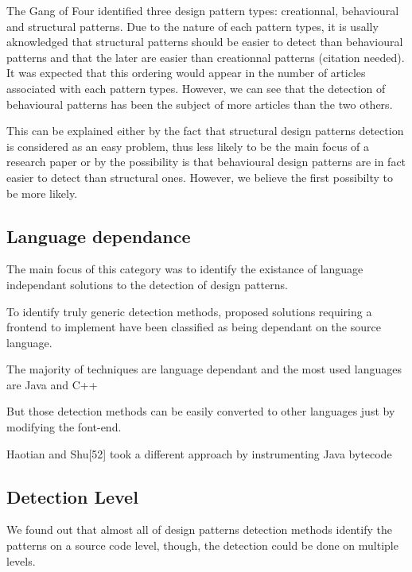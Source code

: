 \documentclass[letterpaper, 10 pt, conference]{ieeeconf}  %
\begin{document}
The Gang of Four identified three design pattern types: creationnal,
behavioural and structural patterns.
Due to the nature of each pattern types, it is usally aknowledged that
structural patterns should be easier to detect than behavioural patterns and
that the later are easier than creationnal patterns (citation needed). 
It was expected that this ordering would appear in the number of articles
associated with each pattern types. 
However, we can see that the detection of behavioural patterns has been the
subject of more articles than the two others.


This can be explained either by the fact that structural design patterns
detection is considered as an easy problem, thus less likely to be the main
focus of a research paper or by the possibility is that behavioural design
patterns are in fact easier to detect than structural ones.
However, we believe the first possibilty to be more likely.



\subsection{Language dependance}
The main focus of this category was to identify the existance of language
independant solutions to the detection of design patterns.

To identify truly generic detection methods, proposed solutions requiring a
frontend to implement have been classified as being dependant on the source
language. 

The majority of techniques are language dependant and the most used 
languages are Java and C++

But those detection methods can be easily converted to other languages
just by modifying the font-end.

Haotian and Shu[52] took a different approach by instrumenting Java bytecode


\subsection{Detection Level}
We found out that almost all of design patterns detection methods 
identify the patterns on a source code level, though, the detection could
be done on multiple levels.
\end{document}
